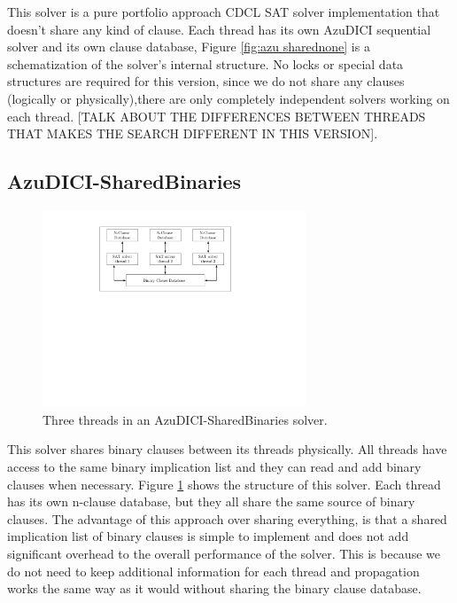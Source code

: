 \documentclass[12pt]{diicc}
\begin{document}
This solver is a pure portfolio approach CDCL SAT solver implementation that doesn't share any kind of clause. Each thread has its own AzuDICI sequential solver and its own clause database, Figure \ref{fig:azu sharednone} is a schematization of the solver's internal structure. No locks or special data structures are required for this version, since we do not share any clauses (logically or physically),there are only completely independent solvers working on each thread. [TALK ABOUT THE DIFFERENCES BETWEEN THREADS THAT MAKES THE SEARCH DIFFERENT IN THIS VERSION].

\subsection{AzuDICI-SharedBinaries}

\begin{figure}[h!]
	\centering
		\includegraphics[width=0.7\textwidth]{sharedbinaries}
	\caption{Three threads in an AzuDICI-SharedBinaries solver.}
	\label{fig:azu sharedbinaries}
\end{figure}

This solver shares binary clauses between its threads physically. All threads have access to the same binary implication list and they can read and add binary clauses when necessary. Figure \ref{fig:azu sharedbinaries} shows the structure of this solver. Each thread has its own n-clause database, but they all share the same source of binary clauses. The advantage of this approach over sharing everything, is that a shared implication list of binary clauses is simple to implement and does not add significant overhead to the overall performance of the solver. This is because we do not need to keep additional information for each thread and propagation works the same way as it would without sharing the binary clause database.
\end{document}
